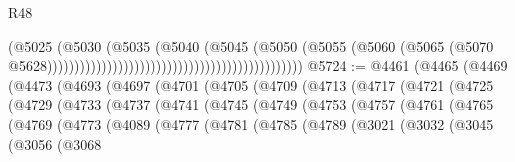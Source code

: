 \begin{lexlean}{R48}
\begin{coremodule}
                                                                              (@5025
                                                                                (@5030
                                                                                  (@5035
                                                                                    (@5040
                                                                                      (@5045
                                                                                        (@5050
                                                                                          (@5055
                                                                                            (@5060
                                                                                              (@5065
                                                                                                (@5070
                                                                                                  @5628)))))))))))))))))))))))))))))))))))))))))))))))
@5724 := @4461
    (@4465
      (@4469
        (@4473
          (@4693
            (@4697
              (@4701
                (@4705
                  (@4709
                    (@4713
                      (@4717
                        (@4721
                          (@4725
                            (@4729
                              (@4733
                                (@4737
                                  (@4741
                                    (@4745
                                      (@4749
                                        (@4753
                                          (@4757
                                            (@4761
                                              (@4765
                                                (@4769
                                                  (@4773
                                                    (@4089
                                                      (@4777
                                                        (@4781
                                                          (@4785
                                                            (@4789
                                                              (@3021
                                                                (@3032
                                                                  (@3045
                                                                    (@3056
                                                                      (@3068

\end{coremodule}
\end{lexlean}
